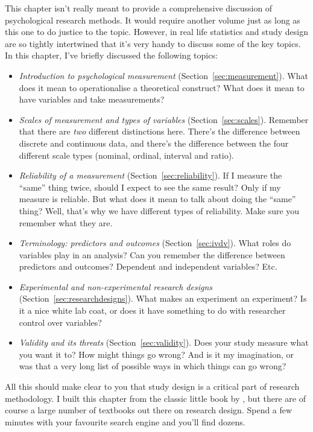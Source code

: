 This chapter isn't really meant to provide a comprehensive discussion of psychological research methods. It would require another volume just as long as this one to do justice to the topic. However, in real life statistics and study design are so tightly intertwined that it's very handy to discuss some of the key topics. In this chapter, I've briefly discussed the following topics:

\begin{itemize}
\item {\it Introduction to psychological measurement} (Section~\ref{sec:measurement}). What does it mean to operationalise a theoretical construct? What does it mean to have variables and take measurements?
\item {\it Scales of measurement and types of variables} (Section~\ref{sec:scales}). Remember that there are {\it two} different distinctions here. There's the difference between discrete and continuous data, and there's the difference between the four different scale types (nominal, ordinal, interval and ratio). 
\item {\it Reliability of a measurement} (Section~\ref{sec:reliability}). If I measure the ``same'' thing twice, should I expect to see the same result? Only if my measure is reliable. But what does it mean to talk about doing the ``same'' thing? Well, that's why we have different types of reliability. Make sure you remember what they are.
\item {\it Terminology: predictors and outcomes} (Section~\ref{sec:ivdv}). What roles do variables play in an analysis? Can you remember the difference between predictors and outcomes? Dependent and independent variables? Etc. 
\item {\it Experimental and non-experimental research designs} (Section~\ref{sec:researchdesigns}). What makes an experiment an experiment? Is it a nice white lab coat, or does it have something to do with researcher control over variables?
\item {\it Validity and its threats} (Section~\ref{sec:validity}). Does your study measure what you want it to? How might things go wrong? And is it my imagination, or was that a very long list of possible ways in which things can go wrong? 
\end{itemize}

All this should make clear to you that study design is a critical part of research methodology. I built this chapter from the classic little book by \textcite{Campbell1963}, but there are of course a large number of textbooks out there on research design. Spend a few minutes with your favourite search engine and you'll find dozens. 


